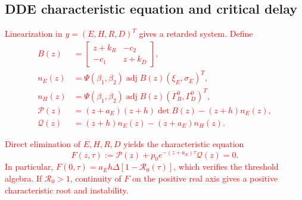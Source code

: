 \documentclass[letterpaper,journal]{IEEEtran}
\begin{document}
	\subsection{DDE characteristic equation and critical delay}
	
	\textcolor{red}{
	Linearization in $y=(E,H,R,D)^T$ gives a retarded system. Define}
	\textcolor{red}{
	\begin{align*}
	B(z)&=\begin{bmatrix}z+k_R&-c_2\\-c_1&z+k_D\end{bmatrix},\\
	n_E(z)&=\Psi(\beta_1,\beta_2)\operatorname{adj}B(z)(\xi_E,\sigma_E)^T,\\
	n_H(z)&=\Psi(\beta_1,\beta_2)\operatorname{adj}B(z)(\Gamma_R^0,\Gamma_D^0)^T,\\
	\mathcal P(z)&=(z+a_E)(z+h)\det B(z)-(z+h)n_E(z),\\
	\mathcal Q(z)&=(z+h)n_E(z)-(z+a_E)n_H(z).
	\end{align*}
	}
	
	\textcolor{red}{
	Direct elimination of $E,H,R,D$ yields the characteristic equation
	}
	\textcolor{red}{
	\begin{equation}
	F(z,\tau):=\mathcal P(z)+p_0e^{-(z+a_E)\tau}\mathcal Q(z)=0.
	\label{eq:characteristic}
	\end{equation}
	In particular,
	$F(0,\tau)=a_Eh\Delta[1-\mathcal R_0(\tau)]$, which verifies the threshold algebra. If $\mathcal R_0>1$, continuity of $F$ on the positive real axis gives a positive characteristic root and instability.
	}
\end{document}
